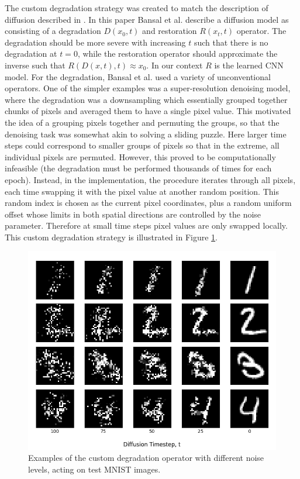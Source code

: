 \documentclass[12pt]{article}
\begin{document}
The custom degradation strategy was created to match the description of diffusion described in \cite{bansal2022cold}.
In this paper Bansal et al. describe a diffusion model as consisting of a degradation $D(x_0,t)$ and restoration $R(x_t, t)$ operator.
The degradation should be more severe with increasing $t$ such that there is no degradation at $t=0$,
while the restoration operator should approximate the inverse such that $R(D(x,t),t) \approx x_0$.
In our context $R$ is the learned CNN model.
For the degradation, Bansal et al. used a variety of unconventional operators.
One of the simpler examples was a super-resolution denoising model,
where the degradation was a downsampling which essentially grouped together chunks of pixels and averaged them to have a single pixel value.
This motivated the idea of a grouping pixels together and permuting the groups,
so that the denoising task was somewhat akin to solving a sliding puzzle.
Here larger time steps could correspond to smaller groups of pixels so that in the extreme, all individual pixels are permuted.
However, this proved to be computationally infeasible (the degradation must be performed thousands of times for each epoch).
Instead, in the implementation, the procedure iterates through all pixels, each time swapping it with the pixel value at another random position.
This random index is chosen as the current pixel coordinates, plus a random uniform offset whose limits in both spatial directions are controlled by the noise parameter.
Therefore at small time steps pixel values are only swapped locally.
This custom degradation strategy is illustrated in Figure \ref{fig:custom}.

\begin{figure}[hp]
    \includegraphics[scale=0.7, center]{figures/custom_degradation.png}
    \caption{Examples of the custom degradation operator with different noise levels, acting on test MNIST images.}
    \label{fig:custom}
\end{figure}
\end{document}

